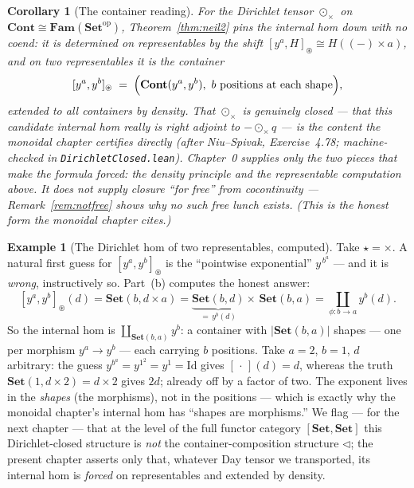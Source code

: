 \documentclass[11pt]{article}
\theoremstyle{plain}
\newtheorem{corollary}[theorem]{Corollary}
\theoremstyle{definition}
\newtheorem{example}[theorem]{Example}
\newcommand{\Set}{\mathbf{Set}}
\newcommand{\Cont}{\mathbf{Cont}}
\newcommand{\Fam}{\mathbf{Fam}}
\newcommand{\op}{^{\mathrm{op}}}
\newcommand{\Day}{\circledast}
\newcommand{\Dayc}{\odot}
\newcommand{\tri}{\triangleleft}       %
\newcommand{\iso}{\cong}
\begin{document}
\begin{corollary}[The container reading]
\label{cor:contclosed}
For the Dirichlet tensor $\Dayc_{\times}$ on $\Cont\iso\Fam(\Set\op)$,
Theorem~\ref{thm:neil2} pins the internal hom down with no coend: it is determined
on representables by the shift $[y^{a},H]_{\Day}\iso H((-)\times a)$, and on two
representables it is the container
\[
  [y^{a},y^{b}]_{\Day}\;=\;\Bigl(\Cont(y^{a},y^{b}),\ \text{$b$ positions at each shape}\Bigr),
\]
extended to all containers by density. That $\Dayc_{\times}$ is genuinely closed
--- that this candidate internal hom really is right adjoint to $-\Dayc_{\times}q$
--- is the content the monoidal chapter certifies directly (after Niu--Spivak,
Exercise~4.78; machine-checked in \texttt{DirichletClosed.lean}). Chapter~0
supplies only the two pieces that make the formula \emph{forced}: the density
principle and the representable computation above. It does \emph{not} supply
closure ``for free'' from cocontinuity --- Remark~\ref{rem:notfree} shows why no
such free lunch exists. \emph{(This is the honest form the monoidal chapter
cites.)}
\end{corollary}

\begin{example}[The Dirichlet hom of two representables, computed]
\label{ex:ccc}
Take $\star=\times$. A natural first guess for $[y^{a},y^{b}]_{\Day}$ is the
``pointwise exponential'' $y^{\,b^{a}}$ --- and it is \emph{wrong}, instructively
so. Part~(b) computes the honest answer:
\[
  [y^{a},y^{b}]_{\Day}(d)=\Set(b,d\times a)=\underbrace{\Set(b,d)}_{=\,y^{b}(d)}\times\,\Set(b,a)
  =\coprod_{\phi\colon b\to a} y^{b}(d).
\]
So the internal hom is $\coprod_{\Set(b,a)}y^{b}$: a container with $|\Set(b,a)|$
shapes --- one per morphism $y^{a}\to y^{b}$ --- each carrying $b$ positions. Take
$a=2$, $b=1$, $d$ arbitrary: the guess $y^{b^{a}}=y^{1^{2}}=y^{1}=\mathrm{Id}$
gives $[\,\cdot\,](d)=d$, whereas the truth $\Set(1,d\times2)=d\times2$ gives
$2d$; already off by a factor of two. The exponent lives in the \emph{shapes}
(the morphisms), not in the positions --- which is exactly why the monoidal
chapter's internal hom has ``shapes are morphisms.''  We flag --- for the next
chapter --- that at the level of the full functor category $[\Set,\Set]$ this
Dirichlet-closed structure is \emph{not} the container-composition structure
$\tri$; the present chapter asserts only that, whatever Day tensor we transported,
its internal hom is \emph{forced} on representables and extended by density.
\end{example}
\end{document}
